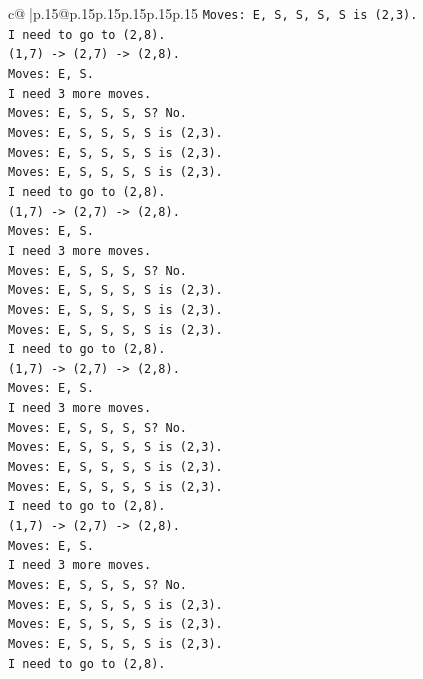 \documentclass{article}
\begin{document}
{\begin{supertabular}{c@{$\;$}|p{.15\linewidth}@{}p{.15\linewidth}p{.15\linewidth}p{.15\linewidth}p{.15\linewidth}p{.15\linewidth}}
{{{\texttt{Moves: E, S, S, S, S is (2,3).} \\
\texttt{I need to go to (2,8).} \\
\texttt{(1,7) {-}> (2,7) {-}> (2,8).} \\
\texttt{Moves: E, S.} \\
\texttt{I need 3 more moves.} \\
\texttt{Moves: E, S, S, S, S? No.} \\
\texttt{Moves: E, S, S, S, S is (2,3).} \\
\texttt{Moves: E, S, S, S, S is (2,3).} \\
\texttt{Moves: E, S, S, S, S is (2,3).} \\
\texttt{I need to go to (2,8).} \\
\texttt{(1,7) {-}> (2,7) {-}> (2,8).} \\
\texttt{Moves: E, S.} \\
\texttt{I need 3 more moves.} \\
\texttt{Moves: E, S, S, S, S? No.} \\
\texttt{Moves: E, S, S, S, S is (2,3).} \\
\texttt{Moves: E, S, S, S, S is (2,3).} \\
\texttt{Moves: E, S, S, S, S is (2,3).} \\
\texttt{I need to go to (2,8).} \\
\texttt{(1,7) {-}> (2,7) {-}> (2,8).} \\
\texttt{Moves: E, S.} \\
\texttt{I need 3 more moves.} \\
\texttt{Moves: E, S, S, S, S? No.} \\
\texttt{Moves: E, S, S, S, S is (2,3).} \\
\texttt{Moves: E, S, S, S, S is (2,3).} \\
\texttt{Moves: E, S, S, S, S is (2,3).} \\
\texttt{I need to go to (2,8).} \\
\texttt{(1,7) {-}> (2,7) {-}> (2,8).} \\
\texttt{Moves: E, S.} \\
\texttt{I need 3 more moves.} \\
\texttt{Moves: E, S, S, S, S? No.} \\
\texttt{Moves: E, S, S, S, S is (2,3).} \\
\texttt{Moves: E, S, S, S, S is (2,3).} \\
\texttt{Moves: E, S, S, S, S is (2,3).} \\
\texttt{I need to go to (2,8).} \\
}}}
\end{supertabular}}
\end{document}
